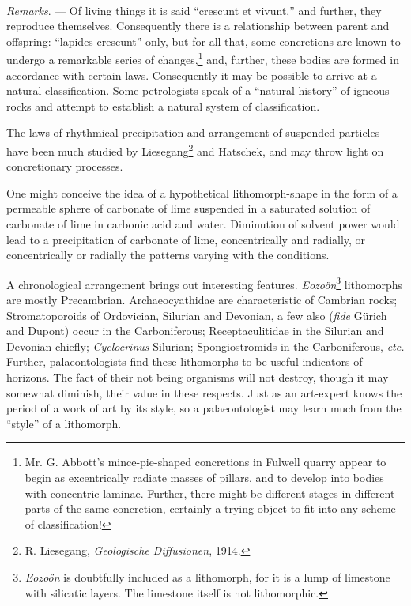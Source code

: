 \documentclass[a4paper, 12pt, oneside, landscape]{article}
\begin{document}
\paragraph{}
\emph{Remarks}. --- Of living things it is said ``crescunt et vivunt,'' and further, they reproduce themselves. Consequently there is a relationship between parent and offspring: ``lapides crescunt'' only, but for all that, some concretions are known to undergo a remarkable series of changes,\footnote{Mr. G. Abbott's mince-pie-shaped concretions in Fulwell quarry appear to begin as excentrically radiate masses of pillars, and to develop into bodies with concentric laminae. Further, there might be different stages in different parts of the same concretion, certainly a trying object to fit into any scheme of classification!} and, further, these bodies are formed in accordance with certain laws. Consequently it may be possible to arrive at a natural classification. Some petrologists speak of a ``natural history'' of igneous rocks and attempt to establish a natural system of classification.

The laws of rhythmical precipitation and arrangement of suspended particles have been much studied by Liesegang\footnote{R. Liesegang, \emph{Geologische Diffusionen}, 1914.} and Hatschek, and may throw light on concretionary processes.

One might conceive the idea of a hypothetical lithomorph-shape in the form of a permeable sphere of carbonate of lime suspended in a saturated solution of carbonate of lime in carbonic acid and water. Diminution of solvent power would lead to a precipitation of carbonate of lime, concentrically and radially, or concentrically or radially the patterns varying with the conditions.

A chronological arrangement brings out interesting features. \emph{Eozoön}\footnote{\emph{Eozoön} is doubtfully included as a lithomorph, for it is a lump of limestone with silicatic layers. The limestone itself is not lithomorphic.} lithomorphs are mostly Precambrian. Archaeocyathidae are characteristic of Cambrian rocks; Stromatoporoids of Ordovician, Silurian and Devonian, a few also (\emph{fide} Gürich and Dupont) occur in the Carboniferous; Receptaculitidae in the Silurian and Devonian chiefly; \emph{Cyclocrinus} Silurian; Spongiostromids in the Carboniferous, \emph{etc.} Further, palaeontologists find these lithomorphs to be useful indicators of horizons. The fact of their not being organisms will not destroy, though it may somewhat diminish, their value in these respects. Just as an art-expert knows the period of a work of art by its style, so a palaeontologist may learn much from the ``style'' of a lithomorph.
\end{document}
